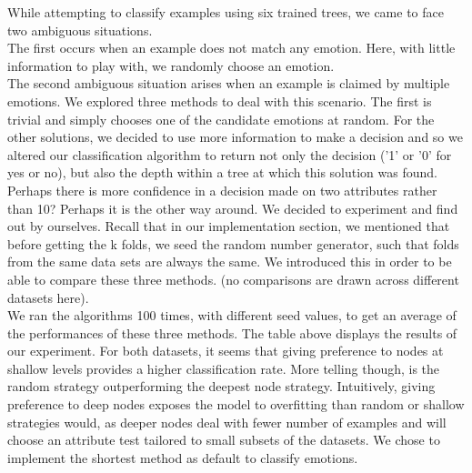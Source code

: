 While attempting to classify examples using six trained trees, we came to face two ambiguous situations.\\
The first occurs when an example does not match any emotion.
Here, with little information to play with, we randomly choose an emotion.\\
The second ambiguous situation arises when an example is claimed by multiple emotions.
We explored three methods to deal with this scenario.
The first is trivial and simply chooses one of the candidate emotions at random.
For the other solutions, we decided to use more information to make a decision and so we altered our classification algorithm
to return not only the decision ('1' or '0' for yes or no), but also the depth within a tree at which this solution was found.
Perhaps there is more confidence in a decision made on two attributes rather than 10? Perhaps it is the other way around.
We decided to experiment and find out by ourselves. Recall that in our implementation section, we mentioned that before getting
the k folds, we seed the random number generator, such that folds from the same data sets are always the same. We introduced this
in order to be able to compare these three methods. (no comparisons are drawn across different datasets here). \\






We ran the algorithms 100 times, with different seed values, to get an average of the performances of these three methods.
The table above displays the results of our experiment.
For both datasets, it seems that giving preference to nodes at shallow levels provides a higher classification rate.
More telling though, is the random strategy outperforming the deepest node strategy.
Intuitively, giving preference to deep nodes exposes the model to overfitting than random or shallow strategies would, as deeper nodes
deal with fewer number of examples and will choose an attribute test tailored to small subsets of the datasets.
We chose to implement the shortest method as default to classify emotions.

